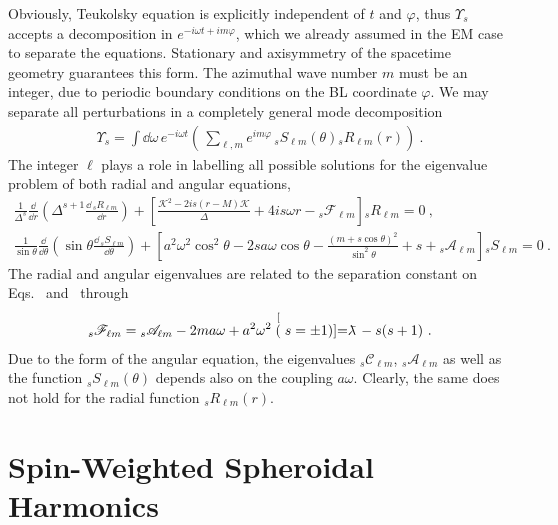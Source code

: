 Obviously, Teukolsky equation is explicitly independent of $t$ and $\varphi$, thus $\Upsilon_s$ accepts a decomposition in $e^{-i \omega t + i m \varphi}$, which we already assumed in the EM case to separate the equations.
Stationary and axisymmetry of the spacetime geometry guarantees this form.
The azimuthal wave number $m$ must be an integer, due to periodic boundary conditions on the BL coordinate $\varphi$.
We may separate all perturbations in a completely general mode decomposition
\begin{align}
    \Upsilon_s = \int\dd\omega \, e^{-i \omega t} \left( \,\sum_{\ell,m} e^{i m \varphi} \, {}_{s}S_{\ell m}(\theta) {}_{s}R_{\ell m}(r) \right) ~.
\end{align}
The integer $\ell$ plays a role in labelling all possible solutions for the eigenvalue problem of both radial and angular equations,
\begin{align}
    \label{eq3:teukolskyRadial}
    \frac{1}{\Delta^s} \frac{\dd}{\dd r} \left( \Delta^{s+1} \frac{\dd\, {}_{s}R_{\ell m}}{\dd r} \right)
    + \left[ \frac{\mathscr{K}^2 - 2 i s (r-M)\mathscr{K}}{\Delta} + 4 i s \omega r -{}_{s}\mathscr{F}_{\ell m}  \right] {}_{s}R_{\ell m} = 0 ~, \\[0.15cm]
    \label{eq3:teukolskyAngular}
    \frac{1}{\sin\theta} \frac{\dd}{\dd\theta} \left( \sin\theta \frac{\dd\, {}_{s}S_{\ell m}}{\dd \theta} \right)
    + \left[ a^2 \omega^2 \cos^2\theta - 2 s a \omega \cos\theta - \frac{(m + s \cos\theta)^2}{\sin^2\theta} + s + {}_{s}\mathscr{A}_{\ell m} \right] {}_{s}S_{\ell m}  = 0~.
\end{align}
The radial and angular eigenvalues are related to the separation constant on Eqs.~ and~ through
\begin{align}
    {}_{s}\mathscr{F}_{\ell m} = {}_{s}\mathscr{A}_{\ell m} - 2 m a \omega + a^2 \omega^2 \stackrel[(s=\pm 1)]{}{=} \lambdabar - s(s+1) ~.
    \label{eq3:relationEVs}
\end{align}
Due to the form of the angular equation, the eigenvalues ${}_{s}\mathscr{C}_{\ell m}$, ${}_{s}\mathscr{A}_{\ell m}$ as well as the function ${}_{s}S_{\ell m}(\theta)$ depends also on the coupling $a \omega$.
Clearly, the same does not hold for the radial function ${}_{s}R_{\ell m}(r)$. 

\section{Spin-Weighted Spheroidal Harmonics}

